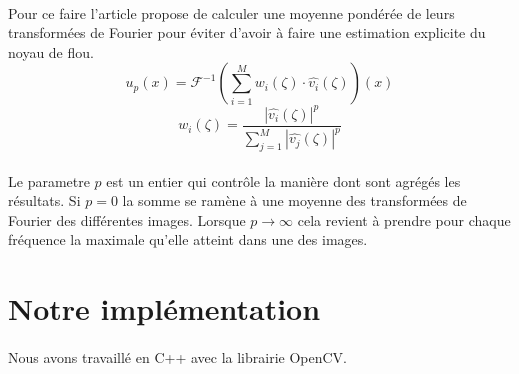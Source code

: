 \documentclass[a4paper,10pt]{report}
\begin{document}
\paragraph{}
Pour ce faire l'article propose de calculer une moyenne pondérée de leurs transformées 
de Fourier pour éviter d'avoir à faire une estimation explicite du noyau de flou.
\[
  u_{p}(x) = \mathcal{F}^{-1}\left(\sum_{i=1}^M w_{i}(\zeta)\cdot \hat{v_{i}}(\zeta)\right)(x)
\]
\[
  w_{i}(\zeta) = \frac{|\hat{v_{i}}(\zeta)|^p}{\sum_{j=1}^M |\hat{v_{j}}(\zeta)|^p}
\]

\paragraph{}
Le parametre \(p\) est un entier qui contrôle la manière dont sont agrégés les résultats. Si \(p = 0\) la somme 
se ramène à une moyenne des transformées de Fourier des différentes images. Lorsque \(p \rightarrow \infty \) 
cela revient à prendre pour chaque fréquence la maximale qu'elle atteint dans une des images. 

\section{Notre implémentation }
\paragraph{}
Nous avons travaillé en C++ avec la librairie OpenCV.
\end{document}
